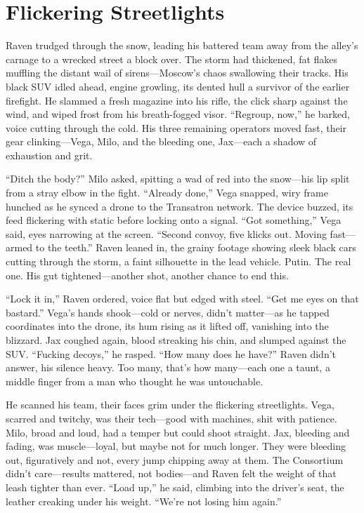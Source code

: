\documentclass[12pt]{book}
\begin{document}
\section{Flickering Streetlights}

Raven trudged through the snow, leading his battered team away from the alley’s carnage to a wrecked street a block over. The storm had thickened, fat flakes muffling the distant wail of sirens—Moscow’s chaos swallowing their tracks. His black SUV idled ahead, engine growling, its dented hull a survivor of the earlier firefight. He slammed a fresh magazine into his rifle, the click sharp against the wind, and wiped frost from his breath-fogged visor. “Regroup, now,” he barked, voice cutting through the cold. His three remaining operators moved fast, their gear clinking—Vega, Milo, and the bleeding one, Jax—each a shadow of exhaustion and grit.

“Ditch the body?” Milo asked, spitting a wad of red into the snow—his lip split from a stray elbow in the fight. “Already done,” Vega snapped, wiry frame hunched as he synced a drone to the Transatron network. The device buzzed, its feed flickering with static before locking onto a signal. “Got something,” Vega said, eyes narrowing at the screen. “Second convoy, five klicks out. Moving fast—armed to the teeth.” Raven leaned in, the grainy footage showing sleek black cars cutting through the storm, a faint silhouette in the lead vehicle. Putin. The real one. His gut tightened—another shot, another chance to end this.

“Lock it in,” Raven ordered, voice flat but edged with steel. “Get me eyes on that bastard.” Vega’s hands shook—cold or nerves, didn’t matter—as he tapped coordinates into the drone, its hum rising as it lifted off, vanishing into the blizzard. Jax coughed again, blood streaking his chin, and slumped against the SUV. “Fucking decoys,” he rasped. “How many does he have?” Raven didn’t answer, his silence heavy. Too many, that’s how many—each one a taunt, a middle finger from a man who thought he was untouchable.

He scanned his team, their faces grim under the flickering streetlights. Vega, scarred and twitchy, was their tech—good with machines, shit with patience. Milo, broad and loud, had a temper but could shoot straight. Jax, bleeding and fading, was muscle—loyal, but maybe not for much longer. They were bleeding out, figuratively and not, every jump chipping away at them. The Consortium didn’t care—results mattered, not bodies—and Raven felt the weight of that leash tighter than ever. “Load up,” he said, climbing into the driver’s seat, the leather creaking under his weight. “We’re not losing him again.”
\end{document}
